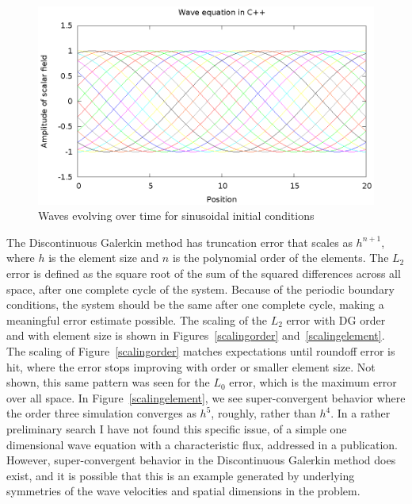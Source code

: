 \begin{figure}
  \includegraphics{sineWave}
  \caption{Waves evolving over time for sinusoidal initial conditions}
  \label{sineWave}
\end{figure}

The Discontinuous Galerkin method has truncation error that scales as $h^{n+1}$, where $h$ is the element size and $n$ is the polynomial order of the elements. The $L_2$ error is defined as the square root of the sum of the squared differences across all space, after one complete cycle of the system. Because of the periodic boundary conditions, the system should be the same after one complete cycle, making a meaningful error estimate possible. The scaling of the $L_2$ error with DG order and with element size is shown in Figures~\ref{scalingorder} and~\ref{scalingelement}. The scaling of Figure~\ref{scalingorder} matches expectations until roundoff error is hit, where the error stops improving with order or smaller element size. Not shown, this same pattern was seen for the $L_0$ error, which is the maximum error over all space. In Figure~\ref{scalingelement}, we see super-convergent behavior where the order three simulation converges as $h^5$, roughly, rather than $h^4$. In a rather preliminary search I have not found this specific issue, of a simple one dimensional wave equation with a characteristic flux, addressed in a publication. However, super-convergent behavior in the Discontinuous Galerkin method does exist, and it is possible that this is an example generated by underlying symmetries of the wave velocities and spatial dimensions in the problem. 

